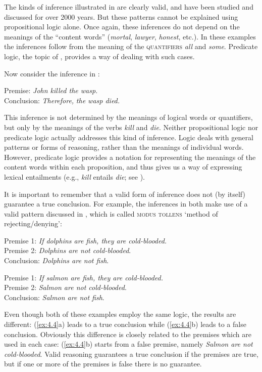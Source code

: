 The kinds of inference illustrated in  are clearly valid, and have been studied and discussed for over 2000 years. But these patterns cannot be explained using propositional logic alone. Once again, these inferences do not depend on the meanings of the “content words” (\textit{mortal}, \textit{lawyer}, \textit{honest}, etc.). In these examples the inferences follow from the meaning of the \textsc{quantifiers} \textit{all} and \textit{some}. Predicate logic, the topic of , provides a way of dealing with such cases.



Now consider the inference in :


\ea \label{ex:4.3}
Premise: \textit{John killed the wasp.\\
}\FelixHRule
Conclusion: \textit{Therefore,} \textit{the wasp died.}
\z


This inference is not determined by the meanings of logical words or quantifiers, but only by the meanings of the verbs \textit{kill} and \textit{die}. Neither propositional logic nor predicate logic actually addresses this kind of inference. Logic deals with general patterns or forms of reasoning, rather than the meanings of individual words. However, predicate logic provides a notation for representing the meanings of the content words within each proposition, and thus gives us a way of expressing lexical entailments (e.g., \textit{kill} entails \textit{die}; see ).



It is important to remember that a valid form of inference does not (by itself) guarantee a true conclusion. For example, the inferences in  both make use of a valid pattern discussed in , which is called \textsc{modus tollens} ‘method of rejecting/denying’:


\ea \label{ex:4.4}
\ea  Premise 1: \textit{If dolphins are fish, they are cold-blooded.}\\
Premise 2: \textit{Dolphins are not cold-blooded}.\\
\FelixHRule
Conclusion: \textit{Dolphins are not fish}.
\medskip 

\ex Premise 1: \textit{If salmon are fish, they are cold-blooded.}\\
Premise 2: \textit{Salmon are not cold-blooded}.\\
\FelixHRule
Conclusion: \textit{Salmon are not fish}.
                       \z
\z


Even though both of these examples employ the same logic, the results are different: (\ref{ex:4.4}a) leads to a true conclusion while (\ref{ex:4.4}b) leads to a false conclusion. Obviously this difference is closely related to the premises which are used in each case: (\ref{ex:4.4}b) starts from a false premise, namely \textit{Salmon are not cold-blooded}. Valid reasoning guarantees a true conclusion if the premises are true, but if one or more of the premises is false there is no guarantee.



